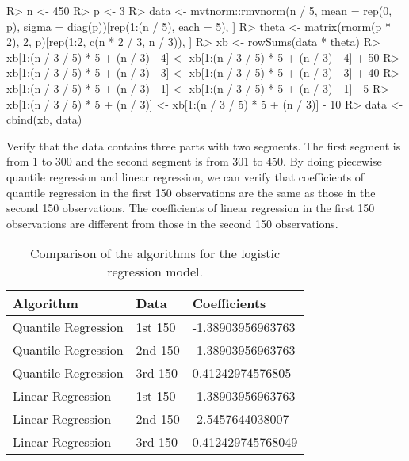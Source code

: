 \documentclass[article]{jss}
\begin{document}
%
\begin{Schunk}
\begin{Sinput}
R> n <- 450
R> p <- 3
R> data <- mvtnorm::rmvnorm(n / 5, mean = rep(0, p), sigma = diag(p))[rep(1:(n / 5), each = 5), ]
R> theta <- matrix(rnorm(p * 2), 2, p)[rep(1:2, c(n * 2 / 3, n / 3)), ]
R> xb <- rowSums(data * theta)
R> xb[1:(n / 3 / 5) * 5 + (n / 3) - 4] <- xb[1:(n / 3 / 5) * 5 + (n / 3) - 4] + 50
R> xb[1:(n / 3 / 5) * 5 + (n / 3) - 3] <- xb[1:(n / 3 / 5) * 5 + (n / 3) - 3] + 40
R> xb[1:(n / 3 / 5) * 5 + (n / 3) - 1] <- xb[1:(n / 3 / 5) * 5 + (n / 3) - 1] - 5
R> xb[1:(n / 3 / 5) * 5 + (n / 3)] <- xb[1:(n / 3 / 5) * 5 + (n / 3)] - 10
R> data <- cbind(xb, data)
\end{Sinput}
\end{Schunk}
%
Verify that the data contains three parts with two segments. The first segment
is from 1 to 300 and the second segment is from 301 to 450. By doing piecewise
quantile regression and linear regression, we can verify that coefficients of
quantile regression in the first 150 observations are the same as those in the
second 150 observations. The coefficients of linear regression in the first 150
observations are different from those in the second 150 observations.

\begin{table}[t!]
\centering
\begin{tabular}{llp{10cm}}
\hline
Algorithm           & Data    & Coefficients \\ \hline
Quantile Regression & 1st 150 & -1.38903956963763 \\
Quantile Regression & 2nd 150 & -1.38903956963763 \\
Quantile Regression & 3rd 150 & 0.41242974576805 \\
Linear Regression   & 1st 150 & -1.38903956963763 \\ \hline
Linear Regression   & 2nd 150 & -2.5457644038007 \\ \hline
Linear Regression   & 3rd 150 & 0.412429745768049 \\ \hline
\end{tabular}
\caption{\label{tab:logistic regression comparison} Comparison of the
algorithms for the logistic regression model.}
\end{table}
\end{document}

